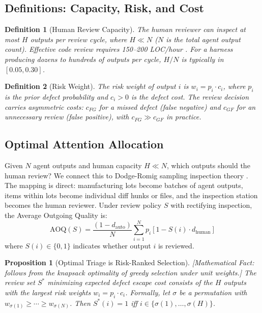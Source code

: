 \documentclass[11pt, a4paper]{googledeepmind}
\newtheorem{definition}{Definition}[section]
\newtheorem{proposition}{Proposition}[section]
\begin{document}
\subsection{Definitions: Capacity, Risk, and Cost}

\begin{definition}[Human Review Capacity]
\label{def:capacity}
The human reviewer can inspect at most $H$ outputs per review cycle, where $H \ll N$ ($N$ is the total agent output count). Effective code review requires 150--200 LOC/hour \citep{fagan1976design, cohen2006best}. For a harness producing dozens to hundreds of outputs per cycle, $H/N$ is typically in $[0.05, 0.30]$.
\end{definition}

\begin{definition}[Risk Weight]
\label{def:risk-weight}
The risk weight of output $i$ is $w_i = p_i \cdot c_i$, where $p_i$ is the prior defect probability and $c_i > 0$ is the defect cost. The review decision carries asymmetric costs: $c_{FG}$ for a missed defect (false negative) and $c_{GF}$ for an unnecessary review (false positive), with $c_{FG} \gg c_{GF}$ in practice.
\end{definition}

\subsection{Optimal Attention Allocation}

Given $N$ agent outputs and human capacity $H \ll N$, which outputs should the human review? We connect this to Dodge-Romig sampling inspection theory \citep{dodge1929method, dodge1959sampling}. The mapping is direct: manufacturing lots become batches of agent outputs, items within lots become individual diff hunks or files, and the inspection station becomes the human reviewer. Under review policy $S$ with rectifying inspection, the Average Outgoing Quality is:
\begin{equation}
\text{AOQ}(S) = \frac{(1 - d_{\text{auto}})}{N} \sum_{i=1}^{N} p_i \left[1 - S(i) \cdot d_{\text{human}}\right]
\end{equation}
where $S(i) \in \{0,1\}$ indicates whether output $i$ is reviewed.

\begin{proposition}[Optimal Triage is Risk-Ranked Selection]
\emph{[Mathematical Fact: follows from the knapsack optimality of greedy selection under unit weights.]}
\label{thm:optimal-triage}
The review set $S^*$ minimizing expected defect escape cost consists of the $H$ outputs with the largest risk weights $w_i = p_i \cdot c_i$. Formally, let $\sigma$ be a permutation with $w_{\sigma(1)} \geq \cdots \geq w_{\sigma(N)}$. Then $S^*(i) = 1$ iff $i \in \{\sigma(1), \ldots, \sigma(H)\}$.
\end{proposition}
\end{document}
